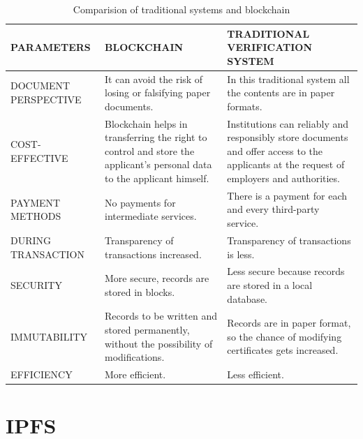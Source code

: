 \begin{table}[H]
    \normalsize
    \begin{center}
    \begin{tabular}{|m{4cm}| m{5.5cm}|m{5.5cm}|}
        \hline
        \textbf{PARAMETERS} & \textbf{BLOCKCHAIN} & \textbf{TRADITIONAL VERIFICATION SYSTEM}\\
        \hline
    DOCUMENT PERSPECTIVE & It can avoid the risk of losing or falsifying paper documents. & In this traditional system all the contents are in paper formats.\\
    \hline
    COST-EFFECTIVE & Blockchain helps in transferring the right to control and store the applicant’s personal data to the applicant himself. & Institutions can reliably and responsibly store documents and offer access to the applicants at the request of employers and authorities.\\
    \hline
    PAYMENT METHODS & No payments for intermediate services. & There is a payment for each and every third-party service.\\
    \hline
    DURING TRANSACTION & Transparency of transactions increased. & Transparency of transactions is less.\\
        \hline

        SECURITY & More secure, records are stored in blocks. & Less secure because records are stored in a local database.\\

        \hline

        IMMUTABILITY &
Records to be written and stored permanently, without the possibility of modifications. &
Records are in paper format, so the chance of modifying certificates gets increased.\\

\hline
EFFICIENCY &
More efficient. &
Less efficient. \\

\hline
    \end{tabular}  
    \caption{Comparision of traditional systems and blockchain}
    \label{table-example}
    \end{center}
    \end{table}

\section{IPFS}

